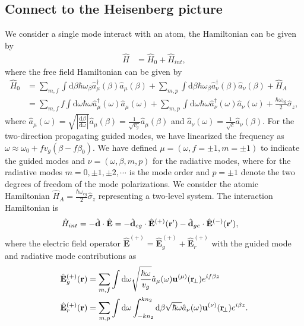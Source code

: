 \documentclass[preprint,aps,pra,onecolumn]{revtex4-1} %
\begin{document}
\subsection{Connect to the Heisenberg picture}
We consider a single mode interact with an atom, the Hamiltonian can be given by
\begin{align}
\hat{H} &= \hat{H}_0 + \hat{H}_{int}, 
\end{align}
where the free field Hamiltonian can be given by
\begin{align}
\hat{H}_0 &= \sum_{m,f} \int \mathrm{d}\beta \hbar \omega_{\beta} \hat{a}^\dagger_\mu(\beta)\hat{a}_\mu (\beta) +\sum_{m,p} \int \mathrm{d}\beta \hbar \omega_{\beta} \hat{a}^\dagger_\nu(\beta)\hat{a}_\nu (\beta)+ \hat{H}_A \\
&= \sum_{m,f} f\int \mathrm{d}\omega \hbar \omega \hat{a}^\dagger_\mu(\omega)\hat{a}_\mu (\omega) +\sum_{m,p} \int \mathrm{d}\omega \hbar \omega \hat{a}^\dagger_\nu(\omega)\hat{a}_\nu (\omega)+ \frac{\hbar\omega_{eg}}{2}\hat{\sigma}_z,
\end{align}
where $\hat{a}_\mu (\omega)= \sqrt{\left| \frac{\mathrm{d}\beta}{\mathrm{d}\omega}\right| }\hat{a}_\mu (\beta)=\frac{1}{\sqrt{v_g}}\hat{a}_\mu (\beta)$ and $\hat{a}_\nu (\omega)=  \frac{1}{\sqrt{c}}\hat{a}_\nu (\beta)$. For the two-direction propagating guided modes, we have linearized the frequency as $\omega\approx \omega_0+fv_g(\beta-f\beta_0)$. We have defined $\mu=(\omega,f=\pm 1,m=\pm 1)$ to indicate the guided modes and $\nu=(\omega,\beta,m,p)$ for the radiative modes, where for the radiative modes $m=0,\pm 1,\pm 2,\cdots$ is the mode order and $p=\pm 1$ denote the two degrees of freedom of the mode polarizations.  We consider the atomic Hamiltonian $\hat{H}_A = \frac{\hbar\omega_{eg}}{2}\hat{\sigma}_z$ representing a two-level system. The interaction Hamiltonian is
\begin{align}
\hat{H}_{int} &= -\hat{\mathbf{d}}\cdot \hat{\mathbf{E}}=-\hat{\mathbf{d}}_{eg}\cdot \hat{\mathbf{E}}^{(+)}(\mathbf{r}')-\hat{\mathbf{d}}_{ge}\cdot \hat{\mathbf{E}}^{(-)}(\mathbf{r}'),
\end{align}
where the electric field operator $\hat{\mathbf{E}}^{(+)}=\hat{\mathbf{E}}_g^{(+)}+\hat{\mathbf{E}}_{r}^{(+)}$ with  the guided mode and radiative mode contributions as 
\begin{align}
\hat{\mathbf{E}}_g^{(+)}(\mathbf{r}) &= \sum_{m,f} \int \mathrm{d}\omega\sqrt{\frac{\hbar \omega}{v_g}} \hat{a}_\mu (\omega) \mathbf{u}^{(\mu)}(\mathbf{r}\!_\perp) e^{if\beta z}\\
\hat{\mathbf{E}}_r^{(+)}(\mathbf{r}) &= \sum_{m,p} \int \mathrm{d}\omega\int_{-kn_2}^{kn_2}\mathrm{d}\beta \sqrt{\hbar \omega} \hat{a}_\nu (\omega) \mathbf{u}^{(\nu)}(\mathbf{r}\!_\perp) e^{i\beta z}.
\end{align}
\end{document}
